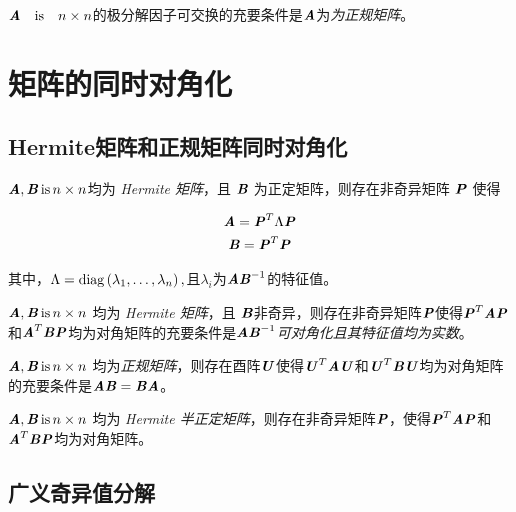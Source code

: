 \begin{theorem}
    $\ann$的极分解因子可交换的充要条件是$\MA$为\emph{为正规矩阵}。
\end{theorem}

\section{矩阵的同时对角化}
\label{sec:矩阵的同时对角化}

\subsection{Hermite矩阵和正规矩阵同时对角化}
\label{sub:Hermite矩阵和正规矩阵同时对角化}

\begin{theorem}
    $\MA, \MB\,\text{is}\,n \times n$均为 \emph{Hermite 矩阵}，且 $\MB$ 为正定矩阵，则存在非奇异矩阵 $\MP$ 使得

    \begin{gather}
        \MA = \MP^T \Lambda \MP  \\
        \MB = \MP^T \MP
    \end{gather}

    其中，$\Lambda = \diag\left(\lambda_1, \ldots, \lambda_n\right),$且$\lambda_i$为$\MA\MB^{-1}$的特征值。
\end{theorem}

\begin{theorem}
    $\MA,\MB \,\text{is}\, n\times n$ 均为 \emph{Hermite 矩阵}，且 $\MB$非奇异，则存在非奇异矩阵$\MP$使得$\MP^T \MA \MP$和$\MA^T \MB \MP$均为对角矩阵的充要条件是$\MA\MB^{-1}$\emph{可对角化且其特征值均为实数}。
\end{theorem}

\begin{theorem}
    $\MA,\MB \,\text{is}\, n\times n$ 均为\emph{正规矩阵}，则存在酉阵$\MU$使得$\MU^T\MA\MU$和$\MU^T\MB\MU$均为对角矩阵的充要条件是$\MA\MB=\MB\MA$。
\end{theorem}

\begin{theorem}
    $\MA,\MB \,\text{is}\, n\times n$ 均为 \emph{Hermite 半正定矩阵}，则存在非奇异矩阵$\MP$，使得$\MP^T\MA\MP$和$\MA^T\MB\MP$均为对角矩阵。
\end{theorem}

\subsection{广义奇异值分解}
\label{sub:广义奇异值分解}

